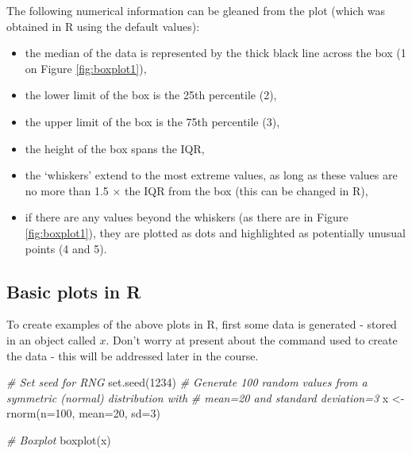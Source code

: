 \documentclass[
  oneside]{krantz}
\newenvironment{Shaded}{\begin{snugshade}}{\end{snugshade}}
\newcommand{\AttributeTok}[1]{\textcolor[rgb]{0.77,0.63,0.00}{#1}}
\newcommand{\CommentTok}[1]{\textcolor[rgb]{0.56,0.35,0.01}{\textit{#1}}}
\newcommand{\DecValTok}[1]{\textcolor[rgb]{0.00,0.00,0.81}{#1}}
\newcommand{\FunctionTok}[1]{\textcolor[rgb]{0.00,0.00,0.00}{#1}}
\newcommand{\NormalTok}[1]{#1}
\newcommand{\OtherTok}[1]{\textcolor[rgb]{0.56,0.35,0.01}{#1}}
\begin{document}
The following numerical information can be gleaned from the plot (which was obtained in R using the default values):

\begin{itemize}
\item
  the median of the data is represented by the thick black line across the box (\color{blue}1 \color{black} on Figure \ref{fig:boxplot1}),
\item
  the lower limit of the box is the 25th percentile (\color{blue}2\color{black}),
\item
  the upper limit of the box is the 75th percentile (\color{blue}3\color{black}),
\item
  the height of the box spans the IQR,
\item
  the `whiskers' extend to the most extreme values, as long as these values are no more than 1.5 \(\times\) the IQR from the box (this can be changed in R),
\item
  if there are any values beyond the whiskers (as there are in Figure \ref{fig:boxplot1}), they are plotted as dots and highlighted as potentially unusual points (\color{blue}4 \color{black} and \color{blue}5\color{black}).
\end{itemize}

\hypertarget{basic-plots-in-r}{%
\subsection{Basic plots in R}\label{basic-plots-in-r}}

To create examples of the above plots in R, first some data is generated - stored in an object called \(x\). Don't worry at present about the command used to create the data - this will be addressed later in the course.

\begin{Shaded}
\begin{Highlighting}[]
\CommentTok{\# Set seed for RNG}
\FunctionTok{set.seed}\NormalTok{(}\DecValTok{1234}\NormalTok{)}
\CommentTok{\# Generate 100 random values from a symmetric (normal) distribution with}
\CommentTok{\#   mean=20 and standard deviation=3}
\NormalTok{x }\OtherTok{\textless{}{-}} \FunctionTok{rnorm}\NormalTok{(}\AttributeTok{n=}\DecValTok{100}\NormalTok{, }\AttributeTok{mean=}\DecValTok{20}\NormalTok{, }\AttributeTok{sd=}\DecValTok{3}\NormalTok{)}

\CommentTok{\# Boxplot}
\FunctionTok{boxplot}\NormalTok{(x)}
\end{Highlighting}
\end{Shaded}
\end{document}
